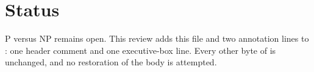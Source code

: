 \documentclass[11pt]{article}
\begin{document}
\section{Status}
P versus NP remains open. This review adds this file and two annotation
lines to : one header comment and one executive-box line.
Every other byte of  is unchanged, and no restoration of
the body is attempted.

\end{document}

